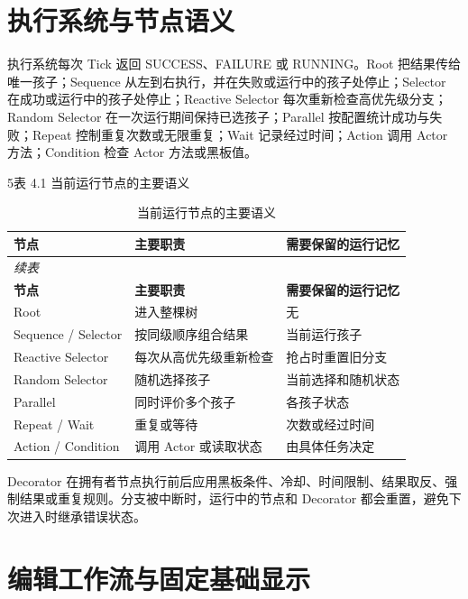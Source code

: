 \documentclass[11pt,a4paper,oneside,extrafontsizes]{memoir}
\begin{document}
\section{执行系统与节点语义}

执行系统每次 Tick 返回 SUCCESS、FAILURE 或 RUNNING。Root 把结果传给唯一孩子；Sequence 从左到右执行，并在失败或运行中的孩子处停止；Selector 在成功或运行中的孩子处停止；Reactive Selector 每次重新检查高优先级分支；Random Selector 在一次运行期间保持已选孩子；Parallel 按配置统计成功与失败；Repeat 控制重复次数或无限重复；Wait 记录经过时间；Action 调用 Actor 方法；Condition 检查 Actor 方法或黑板值。

5表 4.1 当前运行节点的主要语义

\begin{center}

\begin{longtable}{@{}p{} p{} p{}@{}}
\caption{当前运行节点的主要语义}\label{tab:runtime-node-semantics}\\
\toprule
\textbf{节点} & \textbf{主要职责} & \textbf{需要保留的运行记忆} \\
\midrule
\endfirsthead
\multicolumn{3}{l}{\itshape 续表}\\
\toprule
\textbf{节点} & \textbf{主要职责} & \textbf{需要保留的运行记忆} \\
\midrule
\endhead
Root & 进入整棵树 & 无 \\
Sequence / Selector & 按同级顺序组合结果 & 当前运行孩子 \\
Reactive Selector & 每次从高优先级重新检查 & 抢占时重置旧分支 \\
Random Selector & 随机选择孩子 & 当前选择和随机状态 \\
Parallel & 同时评价多个孩子 & 各孩子状态 \\
Repeat / Wait & 重复或等待 & 次数或经过时间 \\
Action / Condition & 调用 Actor 或读取状态 & 由具体任务决定 \\
\bottomrule
\end{longtable}
\end{center}

Decorator 在拥有者节点执行前后应用黑板条件、冷却、时间限制、结果取反、强制结果或重复规则。分支被中断时，运行中的节点和 Decorator 都会重置，避免下次进入时继承错误状态。

\section{编辑工作流与固定基础显示}
\end{document}
